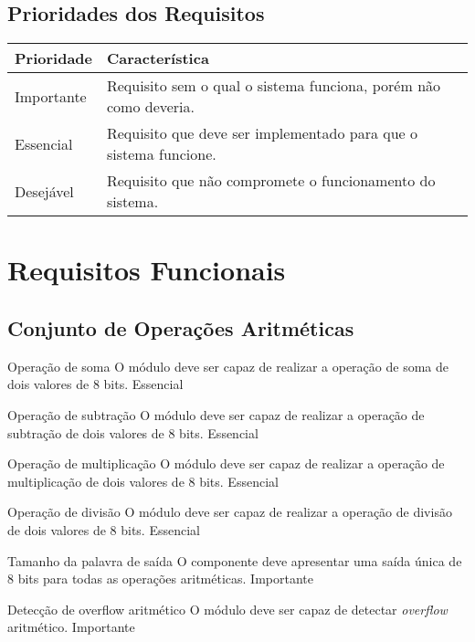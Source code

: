 \documentclass{article}
\begin{document}
  \subsection{Prioridades dos Requisitos}
    \FloatBarrier
    \begin{table}[H]
      \begin{center}
        \begin{tabular}[pos]{|m{2cm} | m{12cm}|} 
          \hline
          \cellcolor[gray]{0.9}\textbf{Prioridade} & \cellcolor[gray]{0.9}\textbf{Característica} \\ \hline
          Importante      & Requisito sem o qual o sistema funciona, porém não como deveria.  \\ \hline
          Essencial       & Requisito que deve ser implementado para que o sistema funcione.  \\ \hline
          Desejável       & Requisito que não compromete o funcionamento do sistema.  \\ \hline
        \end{tabular}
      \end{center}
    \end{table}  

\section{Requisitos Funcionais}
  \subsection{Conjunto de Operações Aritméticas} 
  
    \begin{functional}
      \requirement
      {Operação de soma}
      {O módulo deve ser capaz de realizar a operação de soma de dois valores de 8 bits.}
      {Essencial}

      \requirement
      {Operação de subtração}
      {O módulo deve ser capaz de realizar a operação de subtração de dois valores de 8 bits.}
      {Essencial}

      \requirement
      {Operação de multiplicação}
      {O módulo deve ser capaz de realizar a operação de multiplicação de dois valores de 8 bits. }
      {Essencial}

      \requirement
      {Operação de divisão}
      {O módulo deve ser capaz de realizar a operação de divisão de dois valores de 8 bits.}
      {Essencial} 

      \requirement
      {Tamanho da palavra de saída}
      {O componente deve apresentar uma saída única de 8 bits para todas as operações aritméticas.}
      {Importante}       

      \requirement
      {Detecção de overflow aritmético}
      {O módulo deve ser capaz de detectar \textit{overflow} aritmético.}
      {Importante}
    \end{functional}
\end{document}
